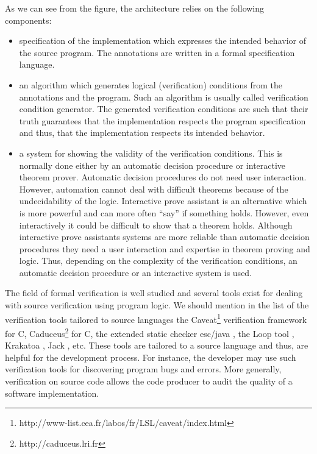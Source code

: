 As we can see from the figure, the architecture relies on the following components:
\begin{itemize} 
   \item specification of the implementation which expresses the intended behavior of the source program. The annotations
         are written in a formal specification language. 
   \item an algorithm which  generates logical (verification) conditions  from the annotations and the program.
         Such an algorithm is usually called verification condition generator. 
         The generated verification conditions are such that their truth guarantees that the implementation respects the program specification  and thus,
         that the implementation respects its intended behavior.
    
   \item a system for showing the validity of the verification conditions. This is normally done either by an automatic decision 
         procedure or interactive theorem prover.
         Automatic decision procedures do not need user interaction.
         However, automation cannot deal with difficult theorems because of the undecidability of the logic.
         Interactive prove assistant is an alternative which is 
         more powerful and can more often ``say'' if something holds. However, even  interactively it could be difficult to show 
	 that a theorem holds. Although interactive prove assistants systems are more reliable than automatic decision procedures they need a user interaction and expertise in theorem proving and logic. 
         Thus, depending on the complexity of the verification conditions, an automatic decision procedure or an interactive system is used.

   \end{itemize} 



 The field of formal  verification is well studied and several  tools exist for
dealing with  source verification using program logic. We should mention in the list of the verification tools tailored to source languages
the Caveat\footnote{http://www-list.cea.fr/labos/fr/LSL/caveat/index.html} verification framework  for C,
 Caduceus\footnote{http://caduceus.lri.fr} for C,  the extended static checker
esc/java \cite{escjava}, the Loop tool \cite{jacobs03java},
Krakatoa \cite{marche03krakatoa}, Jack \cite{BRL-JACK}, etc. These tools are tailored to a source language and thus,
 are helpful for the development process. For instance, the developer may use such verification tools for discovering program bugs and
 errors. More generally, verification on source code allows the code producer to audit the quality of a software implementation.
 
